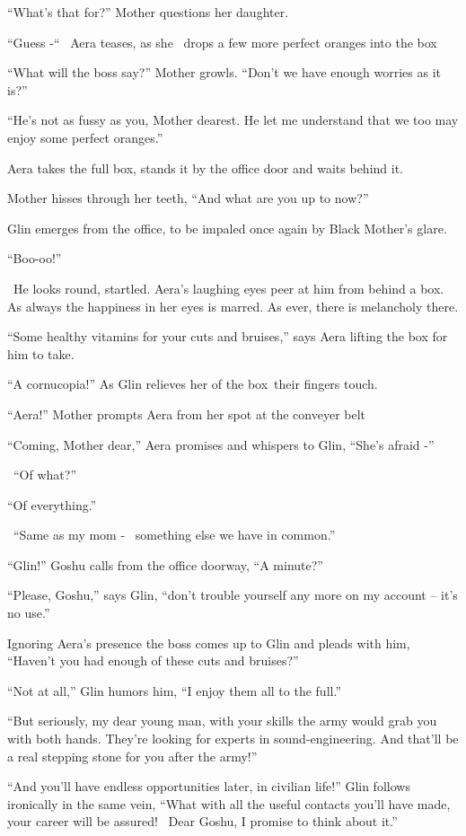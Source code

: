 \documentclass[twoside,11pt]{book}
\begin{document}
``What's that for?'' Mother questions her daughter.

``Guess -``~ Aera teases, as she \ drops a few more perfect oranges into the box

``What will the boss say?'' Mother growls. ``Don't we have enough worries as it
is?''

``He's not as fussy as you, Mother dearest. He let me understand that we too may enjoy some perfect
oranges.''

Aera takes the full box, stands it by the office door and waits behind it.

Mother hisses through her teeth, ``And what are you up to now?''

Glin emerges from the office, to be impaled once again by Black Mother's glare.

``Boo-oo!''

~He looks round, startled. Aera's laughing eyes peer at him from behind a box. As always the happiness in her eyes is
marred. As ever, there is melancholy there.

``Some healthy vitamins for your cuts and bruises,'' says Aera lifting the box for him to
take.

``A cornucopia!'' As Glin relieves her of the box~their fingers touch.

``Aera!'' Mother prompts Aera from her spot at the conveyer belt

``Coming, Mother dear,'' Aera promises and whispers to Glin, ``She's afraid
-''

~``Of what?''

``Of everything.''

~``Same as my mom - \ something else we have in common.''

``Glin!'' Goshu calls from the office doorway, ``A minute?''

``Please, Goshu,'' says Glin, ``don't trouble yourself any more on my account --
it's no use.''

Ignoring Aera's presence the boss comes up to Glin and pleads with him, ``Haven't you had enough of these
cuts and bruises?''

``Not at all,'' Glin humors him, ``I enjoy them all to the full.''

``But seriously, my dear young man, with your skills the army would grab you with both hands. They're
looking for experts in sound-engineering. And that'll be a real stepping stone for you after the army!''

``And you'll have endless opportunities later, in civilian life!'' Glin follows
ironically{ }in the same vein, ``What with all the useful contacts you'll have made, your
career will be assured! ~Dear Goshu, I promise to think about it.''
\end{document}
